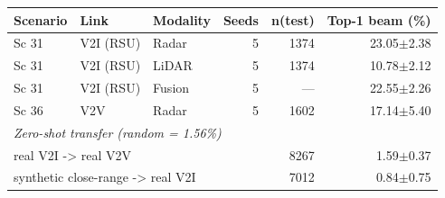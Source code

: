 \begin{tabular}{lllrrr}
\toprule
Scenario & Link & Modality & Seeds & n(test) & Top-1 beam (\%) \\
\midrule
Sc 31 & V2I (RSU) & Radar & 5 & 1374 & 23.05$\pm$2.38 \\
Sc 31 & V2I (RSU) & LiDAR & 5 & 1374 & 10.78$\pm$2.12 \\
Sc 31 & V2I (RSU) & Fusion & 5 & --- & 22.55$\pm$2.26 \\
Sc 36 & V2V & Radar & 5 & 1602 & 17.14$\pm$5.40 \\
\midrule
\multicolumn{6}{l}{\emph{Zero-shot transfer (random = 1.56\%)}} \\
\multicolumn{3}{l}{real V2I -> real V2V} & & 8267 & 1.59$\pm$0.37 \\
\multicolumn{3}{l}{synthetic close-range -> real V2I} & & 7012 & 0.84$\pm$0.75 \\
\bottomrule
\end{tabular}
